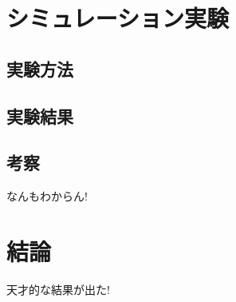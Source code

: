 \documentclass[../main]{subfiles}
\begin{document}
\newpage
\chapter{シミュレーション実験}
\section{実験方法}
\section{実験結果}
\section{考察}
なんもわからん!

\newpage
\chapter{結論}
天才的な結果が出た!
\end{document}
